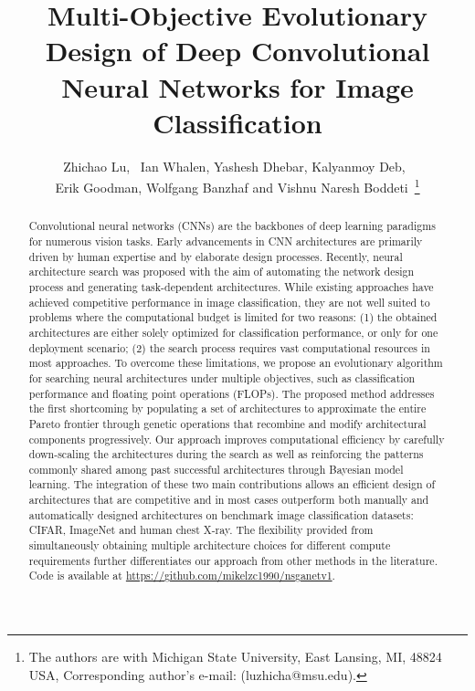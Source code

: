 \documentclass[journal]{IEEEtran}
\theoremstyle{definition}
\theoremstyle{remark}
\begin{document}
\title{Multi-Objective Evolutionary Design of Deep Convolutional Neural Networks for Image Classification}

\author{Zhichao Lu,~ Ian Whalen,
        Yashesh Dhebar,
        Kalyanmoy Deb,~ \\
        Erik Goodman, Wolfgang Banzhaf and Vishnu Naresh Boddeti~\thanks{The authors are with Michigan State University, East Lansing, MI, 48824 USA, Corresponding author's e-mail: (luzhicha@msu.edu).}
}

\maketitle

\begin{abstract}
Convolutional neural networks (CNNs) are the backbones of deep learning paradigms for numerous vision tasks. Early advancements in CNN architectures are primarily driven by human expertise and by elaborate design {processes}. Recently, neural architecture search was proposed with the aim of automating the network design process and generating task-dependent architectures. While existing approaches have achieved competitive performance in image classification, they are not well suited to problems where the computational budget is limited for two reasons: (1) the obtained architectures are either solely optimized for classification performance, or only for one {deployment scenario}; (2) the search process requires vast computational resources in most approaches. To overcome these limitations, we propose an evolutionary algorithm for searching neural architectures under multiple objectives, such as classification performance and {floating point operations (FLOPs)}. The proposed method addresses the first shortcoming by populating a set of architectures to approximate the entire Pareto frontier through genetic operations that recombine and modify architectural components progressively. Our approach improves computational efficiency by carefully down-scaling the architectures during the search as well as reinforcing the patterns commonly shared among past successful architectures through Bayesian {model learning}. The integration of these two main contributions allows an efficient design of architectures that are competitive and in {most} cases outperform both manually and automatically designed architectures on benchmark image classification datasets: CIFAR, ImageNet and human chest X-ray. The flexibility provided from simultaneously obtaining multiple architecture choices for different compute requirements further differentiates our approach from other methods in the literature. Code is available at \url{https://github.com/mikelzc1990/nsganetv1}.
\end{abstract}
\end{document}
